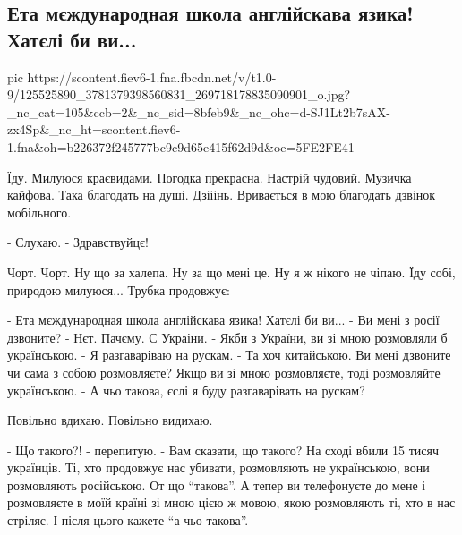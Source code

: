  
 
 
 
 
 
\subsection{Ета мєждународная школа англійскава язика! Хатєлі би ви...}
\label{sec:15_11_2020.fb.nitsoi_larysa.1.shkola_eng_mova}

\ifcmt
pic https://scontent.fiev6-1.fna.fbcdn.net/v/t1.0-9/125525890_3781379398560831_269718178835090901_o.jpg?_nc_cat=105&ccb=2&_nc_sid=8bfeb9&_nc_ohc=d-SJ1Lt2b7sAX-zx4Sp&_nc_ht=scontent.fiev6-1.fna&oh=b226372f245777bc9c9d65e415f62d9d&oe=5FE2FE41
\fi

\obeycr
Їду. Милуюся краєвидами. Погодка прекрасна. Настрій чудовий. Музичка кайфова.
Така благодать на душі.  Дзііінь. Вривається в мою благодать дзвінок
мобільного.

- Слухаю.
- Здравствуйцє!

Чорт. Чорт. Ну що за халепа. Ну за що мені це. Ну я ж нікого не чіпаю. Їду
собі, природою милуюся...  Трубка продовжує:

- Ета мєждународная школа англійскава язика! Хатєлі би ви...
- Ви мені з росії дзвоните? 
- Нєт. Пачєму. С Украіни.
- Якби з України, ви зі мною розмовляли б українською. 
- Я разгаваріваю на рускам. 
- Та хоч китайською. Ви мені дзвоните чи сама з собою розмовляєте?  Якщо ви зі мною розмовляєте, тоді розмовляйте українською. 
- А чьо такова, єслі я буду разгаварівать на рускам? 

Повільно вдихаю. Повільно видихаю. 

- Що такого?! - перепитую. - Вам сказати, що такого? На сході вбили 15 тисяч українців. Ті, хто продовжує нас убивати, розмовляють не українською, вони розмовляють російською. От що \enquote{такова}. А тепер ви телефонуєте до мене і розмовляєте в моїй країні зі мною цією ж мовою, якою розмовляють ті, хто в нас стріляє. І після цього кажете \enquote{а чьо такова}.


